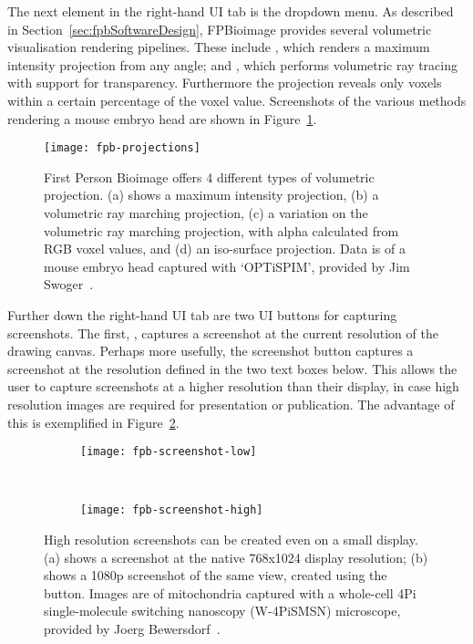 The next element in the right-hand UI tab is the  dropdown menu.
As described in Section~\ref{sec:fpbSoftwareDesign}, FPBioimage provides several volumetric visualisation rendering pipelines.
These include , which renders a maximum intensity projection from any angle; and , which performs volumetric ray tracing with support for transparency.
Furthermore the  projection reveals only voxels within a certain percentage of the  voxel value.
Screenshots of the various  methods rendering a mouse embryo head are shown in Figure~\ref{fig:fpbProjections}.

\begin{figure}[htbp!]
\centering
\texttt{[image: fpb-projections]}
\caption[FPBioimage: Four projection methods highlight different details in volumetric data]{First Person Bioimage offers 4 different types of volumetric projection. (a) shows a maximum intensity projection, (b) a volumetric ray marching projection, (c) a variation on the volumetric ray marching projection, with alpha calculated from RGB voxel values, and (d) an iso-surface projection. Data is of a mouse embryo head captured with `OPTiSPIM', provided by Jim Swoger~\cite{mayer2014optispim}. }
\label{fig:fpbProjections}
\end{figure}

Further down the right-hand UI tab are two UI buttons for capturing screenshots.
The first, , captures a screenshot at the current resolution of the drawing canvas.
Perhaps more usefully, the  screenshot button captures a screenshot at the resolution defined in the two text boxes below.
This allows the user to capture screenshots at a higher resolution than their display, in case high resolution images are required for presentation or publication.
The advantage of this is exemplified in Figure~\ref{fig:fpbScreenshots}.

\begin{figure}[htbp!]
\centering
\begin{subfigure}[b]{1.0\textwidth}
\texttt{[image: fpb-screenshot-low]}
\caption{}
\end{subfigure}

~\newline
\begin{subfigure}[b]{1.0\textwidth}
\texttt{[image: fpb-screenshot-high]}
\caption{}
\end{subfigure}
\caption[FPBioimage: Screenshots allow views to be captured at a higher resolution than the user's display]{High resolution screenshots can be created even on a small display. (a) shows a screenshot at the native 768x1024 display resolution; (b) shows a 1080p screenshot of the same view, created using the  button. Images are of mitochondria captured with a whole-cell 4Pi single-molecule switching nanoscopy (W-4PiSMSN) microscope, provided by Joerg Bewersdorf~\cite{huang2016ultra}. }
\label{fig:fpbScreenshots}
\end{figure}

